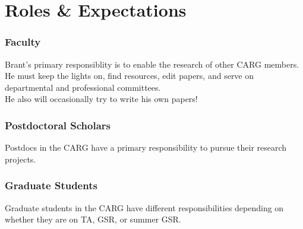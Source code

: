 \section{Roles \& Expectations}
\label{sec:roles}

\subsubsection{Faculty}

Brant's primary responsiblity
is to enable the research
of other CARG members. He
must keep the lights on,
find resources, edit
papers, and serve on departmental
and professional committees.\\

\noindent
He also will occasionally try to
write his own papers!


\subsubsection{Postdoctoral Scholars}

Postdocs in the CARG have
a primary responsibility
to pursue their research 
projects.

\subsubsection{Graduate Students}

Graduate students in the CARG have
different responsibilities
depending on whether they
are on TA, GSR, or summer GSR.
